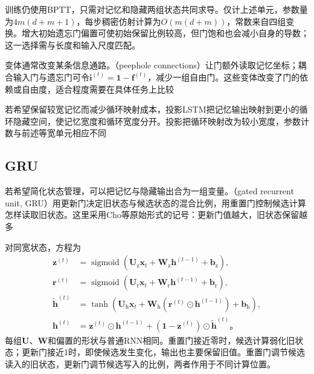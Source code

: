 训练仍使用BPTT，只需对记忆和隐藏两组状态共同求导。仅计上述单元，参数量为$4m(d+m+1)$，每步稠密仿射计算为$O(m(d+m))$，常数来自四组变换。增大初始遗忘门偏置可使初始保留比例较高，但门饱和也会减小自身的导数；这一选择需与长度和输入尺度匹配。

变体通常改变某条信息通路。（peephole connections）让门额外读取记忆坐标；耦合输入门与遗忘门可令$\bm{i}^{(t)}=\bm{1}-\bm{f}^{(t)}$，减少一组自由门。这些变体改变了门的依赖或自由度，适合程度需要在具体任务上比较

若希望保留较宽记忆而减少循环映射成本，投影LSTM把记忆输出映射到更小的循环隐藏空间，使记忆宽度和循环宽度分开。投影把循环映射改为较小宽度，参数计数与前述等宽单元相应不同

\subsection{GRU}
\label{sec:rnn-gru}

若希望简化状态管理，可以把记忆与隐藏输出合为一组变量。（gated recurrent unit, GRU）用更新门决定旧状态与候选状态的混合比例，用重置门控制候选计算怎样读取旧状态。这里采用Cho等原始形式的记号：更新门值越大，旧状态保留越多

对同宽状态，方程为
\begin{equation}
  \begin{aligned}
    \bm{z}^{(t)}&=\operatorname{sigmoid}\!\left(
      \bm{U}_{\mathrm{z}}\bm{x}_t+\bm{W}_{\mathrm{z}}\bm{h}^{(t-1)}
      +\bm{b}_{\mathrm{z}}\right),\\
    \bm{r}^{(t)}&=\operatorname{sigmoid}\!\left(
      \bm{U}_{\mathrm{r}}\bm{x}_t+\bm{W}_{\mathrm{r}}\bm{h}^{(t-1)}
      +\bm{b}_{\mathrm{r}}\right),\\
    \widetilde{\bm{h}}^{(t)}&=\tanh\!\left(
      \bm{U}_{\mathrm{h}}\bm{x}_t
      +\bm{W}_{\mathrm{h}}(\bm{r}^{(t)}\odot\bm{h}^{(t-1)})
      +\bm{b}_{\mathrm{h}}\right),\\
    \bm{h}^{(t)}&=\bm{z}^{(t)}\odot\bm{h}^{(t-1)}
      +(\bm{1}-\bm{z}^{(t)})\odot\widetilde{\bm{h}}^{(t)}\text{。}
  \end{aligned}
  \label{eq:rnn-gru-update}
\end{equation}
每组$\bm{U}$、$\bm{W}$和偏置的形状与普通RNN相同。重置门接近零时，候选计算弱化旧状态；更新门接近1时，即使候选发生变化，输出也主要保留旧值。重置门调节候选读入的旧状态，更新门调节候选写入的比例，两者作用于不同计算位置。

